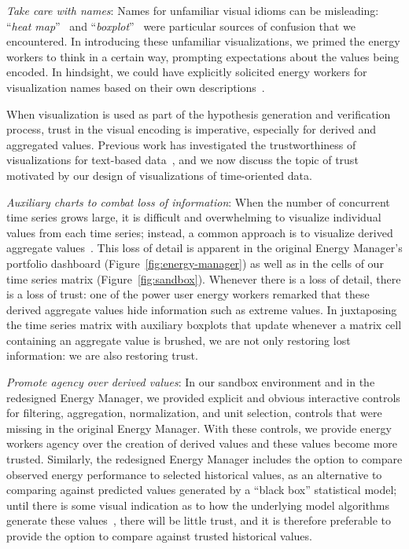 \documentclass[journal]{vgtc}                %
\newcommand{\bstart}[1]{\vspace{1mm} \noindent{\textbf{#1:}}}
\newcommand{\jn}[1]{\textcolor{darkGreen}{#1}}
\begin{document}
{\it Take care with names}: Names for unfamiliar visual idioms can be misleading: ``{\it heat map}''~\cite{Field2015,Wilkinson2009} and ``{\it boxplot}''~\cite{Wickham2011} were particular sources of confusion that we encountered.
In introducing these unfamiliar visualizations, we primed the energy workers to think in a certain way, prompting expectations about the values being encoded. 
In hindsight, we could have explicitly solicited energy workers for visualization names based on their own descriptions~\cite{Metoyer2012}.

\bstart{Trust} When visualization is used as part of the hypothesis generation and verification process, trust in the visual encoding is imperative, especially for derived and aggregated values. %
Previous work has investigated the trustworthiness of visualizations for text-based data~\cite{Chuang2012}, and we now discuss the topic of trust motivated by our design of visualizations of time-oriented data.

{\it Auxiliary charts to combat loss of information}: When the number of concurrent time series grows large, it is difficult and overwhelming to visualize individual values from each time series; instead, a common approach is to visualize derived aggregate values~\cite{McLachlan2008}.
This loss of detail is apparent in the original Energy Manager's portfolio dashboard (Figure~\ref{fig:energy-manager}) as well as in the cells of our time series matrix (Figure~\ref{fig:sandbox}).
Whenever there is a loss of detail, there is a loss of trust: one of the power user energy workers remarked that these derived aggregate values hide information such as extreme values.
In juxtaposing the time series matrix with auxiliary boxplots that update whenever a matrix cell containing an aggregate value is brushed, we are not only restoring lost information: we are also restoring trust.

{\it Promote agency over derived values}: In our sandbox environment and in the redesigned Energy Manager, we provided explicit and obvious interactive controls for filtering, aggregation, normalization, and unit selection, controls that were missing in the original Energy Manager.
With these controls, we provide energy workers agency over the creation of derived values and these values become more trusted.
Similarly, the redesigned Energy Manager includes the option to compare observed energy performance to selected historical values, as an alternative to comparing against predicted values generated by a ``black box'' statistical model; until there is some visual indication as to how the underlying model algorithms generate these values~\cite{Muhlbacher2014}, there will be little trust, and it is therefore preferable to provide the option to compare against trusted historical values.
\end{document}

